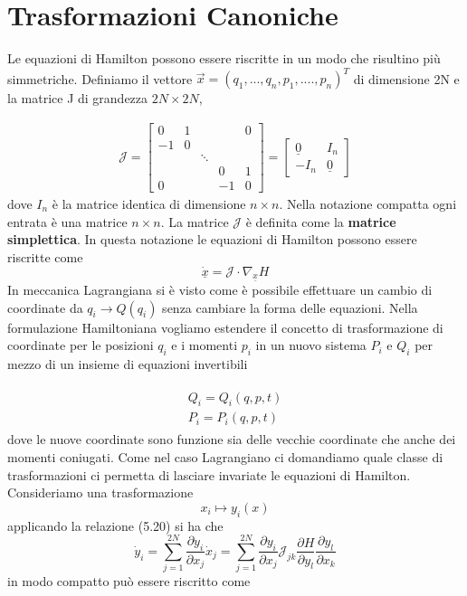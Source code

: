 \section{Trasformazioni Canoniche}

Le equazioni di Hamilton possono essere riscritte in un modo che risultino pi\`{u} simmetriche. Definiamo il vettore $\vec{x} = (q_1,...,q_n,p_1,....,p_n)^T$ di dimensione 2N e la matrice J di grandezza $2N \times 2N$,

\begin{align}
\mathcal{J}=\left[\begin{array}{ccccc}
0 & 1 & & & 0 \\
-1 & 0 & & & \\
& & \ddots & & \\
& & & 0 & 1 \\
0 & & & -1 & 0
\end{array}\right]
= \left[\begin{array}{cc}
		\underline{0} & I_n \\
		-I_n & \underline{0}
\end{array} \right]
\end{align}
dove $I_n$ \`{e} la matrice identica di dimensione $n \times n$. Nella notazione compatta ogni entrata \`{e} una matrice $n \times n$. La matrice $\mathcal{J}$ \`{e} definita come la \textbf{matrice simplettica}. In questa notazione le equazioni di Hamilton possono essere riscritte come 
\begin{equation}
	\underline{\dot{x}} = \mathcal{J} \cdot \nabla_{\underline{x}} H
\end{equation}
In meccanica Lagrangiana si \`{e} visto come \`{e} possibile effettuare un cambio di coordinate da $q_i \rightarrow Q(q_i)$ senza cambiare la forma delle equazioni. Nella formulazione Hamiltoniana vogliamo estendere il concetto di trasformazione di coordinate per le posizioni $q_i$ e i momenti $p_i$ in un nuovo sistema $P_i$ e $Q_i$ per mezzo di un insieme di equazioni invertibili

\begin{align}
	\begin{array}{c}
		Q_i = Q_i(q,p,t)\\[0.5em]
		P_i = P_i(q,p,t)
	\end{array}	
\end{align}
dove le nuove coordinate sono funzione sia delle vecchie coordinate che anche dei momenti coniugati. Come nel caso Lagrangiano ci domandiamo quale classe di trasformazioni ci permetta di lasciare invariate le equazioni di Hamilton. Consideriamo una trasformazione
\begin{equation*}
	x_i \mapsto y_i(x)
\end{equation*}
applicando la relazione (5.20) si ha che 
\begin{equation*}
	\dot{y}_i = \sum_{j=1}^{2N}\dfrac{\partial y_i}{\partial x_j}\dot{x}_j = \sum_{j=1}^{2N}\dfrac{\partial y_i}{\partial x_j} \mathcal{J}_{jk} \dfrac{\partial H}{\partial y_l}\dfrac{\partial y_l}{\partial x_k}
\end{equation*}
in modo compatto pu\`{o} essere riscritto come

